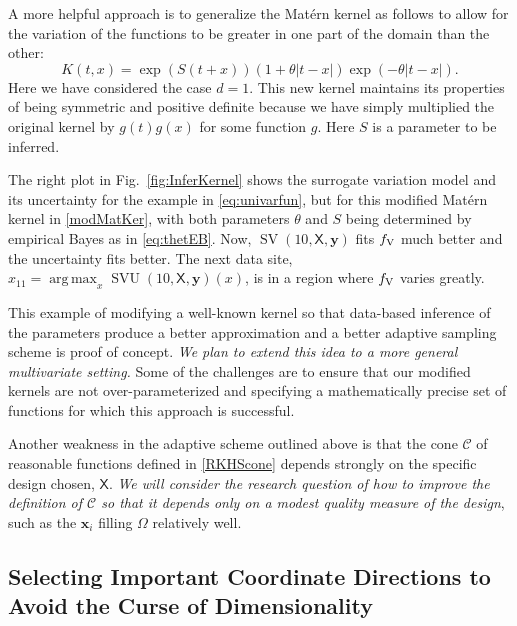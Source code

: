 \documentclass[11pt]{NSFamsart}
\DeclareMathOperator*{\argmax}{arg\,max}
\DeclareMathOperator{\SVAR}{SV} %
\DeclareMathOperator{\SVARERR}{SVU} %
\newcommand{\VAR}{\textup{V}}
\newcommand{\mX}{\mathsf{X}}
\newcommand{\bx}{{\boldsymbol{x}}}
\newcommand{\by}{{\boldsymbol{y}}}
\newcommand{\calc}{{\mathcal{C}}}
\def\abs#1{\ensuremath{\left \lvert #1 \right \rvert}}
\begin{document}
A more helpful approach is to generalize the Mat\'ern kernel as follows to allow for the variation of the functions to be greater in one part of the domain than the other:
\begin{equation} \label{modMatKer}
K(t,x) = \exp(S(t+x))(1 + \theta \abs{t-x}) \exp(-\theta\abs{t-x}).
\end{equation}
Here we have considered the case $d=1$. This new kernel maintains its properties of being symmetric and positive definite because we have simply multiplied the original kernel by $g(t)g(x)$ for some function $g$. Here $S$ is a parameter to be inferred.

The right plot in Fig.\ \ref{fig:InferKernel} shows the surrogate variation model and its uncertainty for the example in \eqref{eq:univarfun}, but for this modified Mat\'ern kernel in \eqref{modMatKer}, with both parameters $\theta$ and $S$ being determined by empirical Bayes as in \eqref{eq:thetEB}. Now, $\SVAR(10,\mX,\by)$ fits $f_{\VAR}$ much better and the uncertainty fits better. The next data site, $x_{11} = \argmax_x \SVARERR(10,\mX,\by)(x)$, is in a region where $f_{\VAR}$ varies greatly. 

This example of modifying a well-known kernel so that data-based inference of the parameters produce a better approximation and a better adaptive sampling scheme is proof of concept. \emph{ We plan to extend this idea to a more general multivariate setting.} Some of the challenges are to ensure that our modified kernels are not over-parameterized and specifying a mathematically precise set of functions for which this approach is successful.

Another weakness in the adaptive scheme outlined above is that the cone $\calc$ of reasonable functions defined in \eqref{RKHScone} depends strongly on the specific design chosen, $\mX$. \emph{We will consider the research question of how to improve the definition of $\calc$ so that it depends only on a modest quality measure of the design}, such as the $\bx_i$ filling $\Omega$ relatively well. 

\subsection{Selecting Important Coordinate Directions to Avoid the Curse of Dimensionality} \label{sec:selectCoord}
\end{document}
